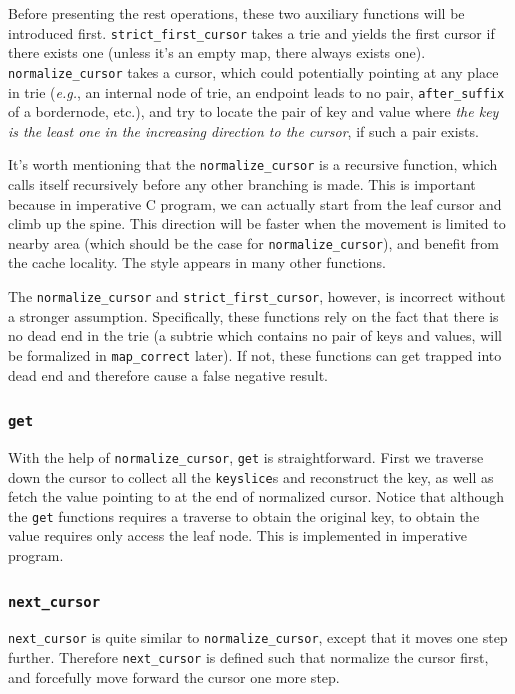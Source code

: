 \documentclass[runningheads]{llncs}
\begin{document}
Before presenting the rest operations, these two auxiliary functions will be
introduced first. \texttt{strict\_first\_cursor} takes a trie and yields the
first cursor if there exists one (unless it's an empty map, there always
exists one). \texttt{normalize\_cursor} takes a cursor, which could potentially
pointing at any place in trie (\textit{e.g.}, an internal node of trie, an
endpoint leads to no pair, \texttt{after\_suffix} of a bordernode, etc.), and
try to locate the pair of key and value where \emph{the key is the least one in
  the increasing direction to the cursor}, if such a pair exists.

It's worth mentioning that the \texttt{normalize\_cursor} is a recursive
function, which calls itself recursively before any other branching is made.
This is important because in imperative C program, we can actually start from
the leaf cursor and climb up the spine. This direction will be faster when
the movement is limited to nearby area (which should be the case for
\texttt{normalize\_cursor}), and benefit from the cache locality. The style
appears in many other functions.

The \texttt{normalize\_cursor} and \texttt{strict\_first\_cursor}, however, is
incorrect without a stronger assumption. Specifically, these functions rely on
the fact that there is no dead end in the trie (a subtrie which contains no pair
of keys and values, will be formalized in \texttt{map\_correct} later). If
not, these functions can get trapped into dead end and therefore cause a false
negative result.

\subsubsection{\texttt{get}}

With the help of \texttt{normalize\_cursor}, \texttt{get} is straightforward.
First we traverse down the cursor to collect all the \texttt{keyslice}s and
reconstruct the key, as well as fetch the value pointing to at the end of
normalized cursor. Notice that although the \texttt{get} functions requires a
traverse to obtain the original key, to obtain the value requires only access
the leaf node. This is implemented in imperative program.

\subsubsection{\texttt{next\_cursor}}

\texttt{next\_cursor} is quite similar to \texttt{normalize\_cursor}, except
that it moves one step further. Therefore \texttt{next\_cursor} is defined such
that normalize the cursor first, and forcefully move forward the cursor one more
step.
\end{document}
